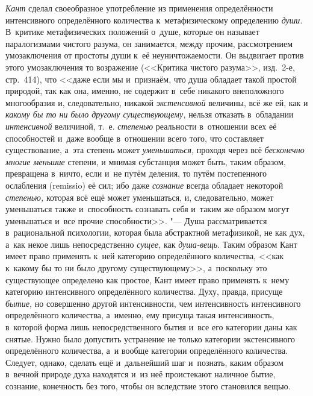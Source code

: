 {\em Кант} сделал своеобразное употребление из применения определённости
интенсивного определённого количества к~метафизическому определению {\em души}.
В~критике метафизических положений о~душе, которые он называет паралогизмами
чистого разума, он занимается, между прочим, рассмотрением умозаключения от
простоты души к~её неуничтожаемости. Он выдвигает против этого умозаключения то
возражение (<<Критика чистого разума>>, изд.~2-е, стр.~414), что <<даже если мы
и~признаём, что душа обладает такой простой природой, так как она, именно, не
содержит в~себе никакого внеположного многообразия и, следовательно, никакой
{\em экстенсивной} величины, всё же ей, как и {\em какому бы то ни было другому
существующему,} нельзя отказать в~обладании {\em интенсивной} величиной, т.~е.
{\em степенью} реальности в~отношении всех её способностей и~даже вообще
в~отношении всего того, что составляет существование, а~эта степень может
{\em уменьшаться,} проходя через всё {\em бесконечно многие меньшие} степени, и
мнимая субстанция может быть, таким образом, превращена в~ничто, если и~не
путём деления, то путём постепенного ослабления (remissio) её сил; ибо даже
{\em сознание} всегда обладает некоторой {\em степенью,} которая всё ещё может
уменьшаться, и, следовательно, может уменьшаться также и~способность сознавать
себя и~таким же образом могут уменьшаться и~все прочие способности>>. "--- Душа
рассматривается в~рациональной психологии, которая была абстрактной
метафизикой, не как дух, а~как некое лишь непосредственно {\em сущее,} как
{\em душа-вещь}. Таким образом Кант имеет право применять к~ней категорию
определённого количества, <<как к~какому бы то ни было другому существующему>>,
а~поскольку это существующее определено как простое, Кант имеет право применять
к~нему категорию интенсивного определённого количества. Духу, правда, присуще
{\em бытие,} но совершенно другой интенсивности, чем интенсивность интенсивного
определённого количества, а~именно, ему присуща такая интенсивность, в~которой
форма лишь непосредственного бытия и~все его категории даны как снятые. Нужно
было допустить устранение не только категории экстенсивного определённого
количества, а~и вообще категории определённого количества. Следует, однако,
сделать ещё и~дальнейший шаг и~познать, каким образом в~вечной природе духа
находятся и~из неё проистекают наличное бытие, сознание, конечность без того,
чтобы он вследствие этого становился вещью.


